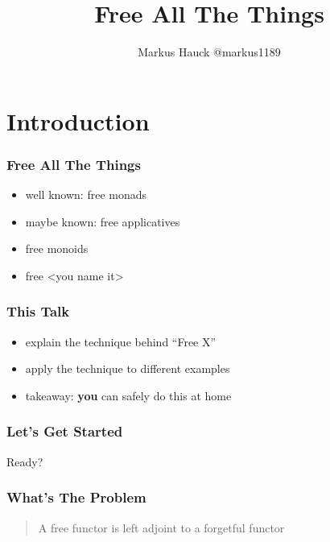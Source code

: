 \documentclass{beamer}
\title{Free All The Things}
\author{Markus Hauck @markus1189}
\begin{document}
\begin{frame}
  \titlepage{}
\end{frame}

\section{Introduction}\label{sec:introduction}

\begin{frame}
\frametitle{Free All The Things}
\begin{itemize}
\item well known: free monads
\item maybe known: free applicatives
\item free monoids
\item free <you name it>
\end{itemize}
\end{frame}

\begin{frame}
  \frametitle{This Talk}
  \begin{itemize}
  \item explain the technique behind ``Free X''
  \item apply the technique to different examples
  \item takeaway: \textbf{you} can safely do this at home
  \end{itemize}
\end{frame}

\begin{frame}
  \frametitle{Let's Get Started}
  \begin{center}
    Ready?
  \end{center}
\end{frame}

\begin{frame}
  \frametitle{What's The Problem}
  \begin{quote}
    A free functor is left adjoint to a forgetful functor
  \end{quote}
\end{frame}
\end{document}
